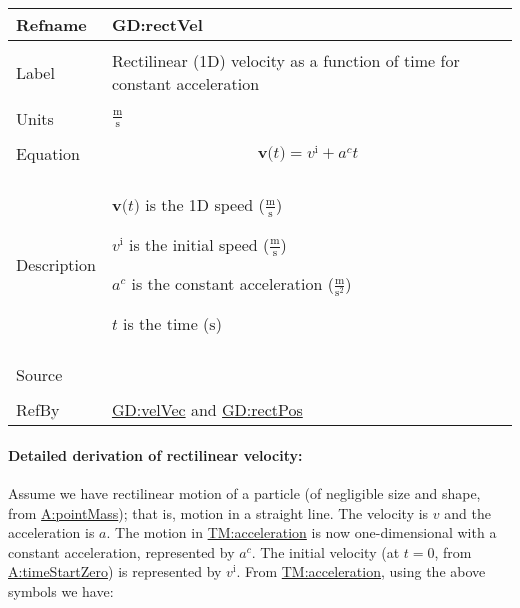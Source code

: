 \documentclass[12pt]{article}
\begin{document}
\vspace{\baselineskip}
\noindent
\begin{minipage}{\textwidth}
\begin{tabular}{>{\raggedright}p{}>{\raggedright\arraybackslash}p{}}
\toprule \textbf{Refname} & \textbf{GD:rectVel}
\label{GD:rectVel}
\\ \midrule \\
Label & Rectilinear (1D) velocity as a function of time for constant acceleration
        
\\ \midrule \\
Units & $\frac{\text{m}}{\text{s}}$
        
\\ \midrule \\
Equation & \begin{displaymath}
           \mathbf{v}\text{(}t\text{)}={v^{\text{i}}}+{a^{c}} t
           \end{displaymath}
\\ \midrule \\
Description & \begin{symbDescription}
              \item{$\mathbf{v}\text{(}t\text{)}$ is the 1D speed ($\frac{\text{m}}{\text{s}}$)}
              \item{${v^{\text{i}}}$ is the initial speed ($\frac{\text{m}}{\text{s}}$)}
              \item{${a^{c}}$ is the constant acceleration ($\frac{\text{m}}{\text{s}^{2}}$)}
              \item{$t$ is the time (${\text{s}}$)}
              \end{symbDescription}
\\ \midrule \\
Source & \cite[(pg. 8)]{hibbeler2004}
         
\\ \midrule \\
RefBy & \hyperref[GD:velVec]{GD:velVec} and \hyperref[GD:rectPos]{GD:rectPos}
        
\\ \bottomrule
\end{tabular}
\end{minipage}
\paragraph{Detailed derivation of rectilinear velocity:}
\label{GD:rectVelDeriv}
Assume we have rectilinear motion of a particle (of negligible size and shape, from \hyperref[pointMass]{A:pointMass}); that is, motion in a straight line. The velocity is $v$ and the acceleration is $a$. The motion in \hyperref[TM:acceleration]{TM:acceleration} is now one-dimensional with a constant acceleration, represented by ${a^{c}}$. The initial velocity (at $t=0$, from \hyperref[timeStartZero]{A:timeStartZero}) is represented by ${v^{\text{i}}}$. From \hyperref[TM:acceleration]{TM:acceleration}, using the above symbols we have:
\end{document}
